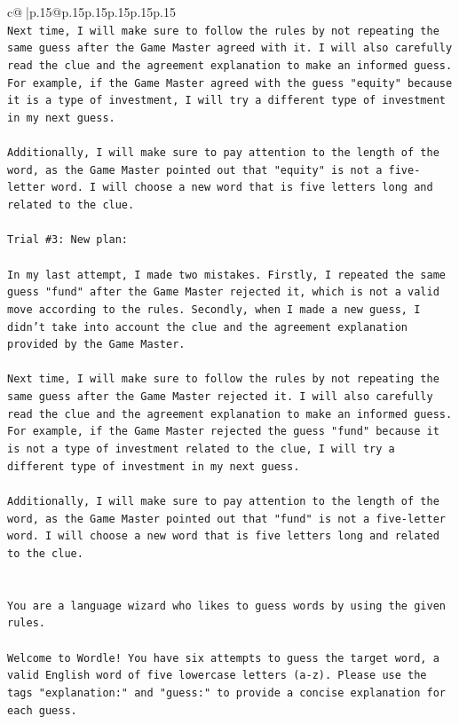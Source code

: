 \documentclass{article}
\begin{document}
{\begin{supertabular}{c@{$\;$}|p{.15\linewidth}@{}p{.15\linewidth}p{.15\linewidth}p{.15\linewidth}p{.15\linewidth}p{.15\linewidth}}
{{{\\ 
\texttt{Next time, I will make sure to follow the rules by not repeating the same guess after the Game Master agreed with it. I will also carefully read the clue and the agreement explanation to make an informed guess. For example, if the Game Master agreed with the guess "equity" because it is a type of investment, I will try a different type of investment in my next guess. } \\
\\ 
\texttt{Additionally, I will make sure to pay attention to the length of the word, as the Game Master pointed out that "equity" is not a five{-}letter word. I will choose a new word that is five letters long and related to the clue.} \\
\\ 
\texttt{Trial \#3: New plan: } \\
\\ 
\texttt{In my last attempt, I made two mistakes. Firstly, I repeated the same guess "fund" after the Game Master rejected it, which is not a valid move according to the rules. Secondly, when I made a new guess, I didn't take into account the clue and the agreement explanation provided by the Game Master. } \\
\\ 
\texttt{Next time, I will make sure to follow the rules by not repeating the same guess after the Game Master rejected it. I will also carefully read the clue and the agreement explanation to make an informed guess. For example, if the Game Master rejected the guess "fund" because it is not a type of investment related to the clue, I will try a different type of investment in my next guess. } \\
\\ 
\texttt{Additionally, I will make sure to pay attention to the length of the word, as the Game Master pointed out that "fund" is not a five{-}letter word. I will choose a new word that is five letters long and related to the clue.} \\
\\ 
\\ 
\texttt{You are a language wizard who likes to guess words by using the given rules.} \\
\\ 
\texttt{Welcome to Wordle! You have six attempts to guess the target word, a valid English word of five lowercase letters (a{-}z). Please use the tags "explanation:" and "guess:" to provide a concise explanation for each guess.} \\
}}}
\end{supertabular}}
\end{document}
